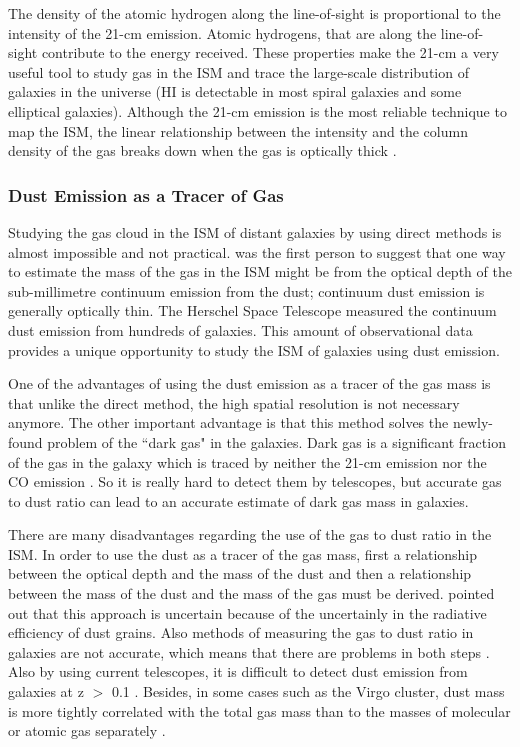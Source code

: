 The density of the atomic hydrogen along the line-of-sight is proportional to the intensity of the 21-cm emission. Atomic hydrogens, that are along the line-of-sight contribute to the energy received. These properties make the 21-cm a very useful tool to study gas in the ISM and trace the large-scale distribution of galaxies in the universe (HI is detectable in most spiral galaxies and some elliptical galaxies). Although the 21-cm emission is the most reliable technique to map the ISM, the linear relationship between the intensity and the column density of the gas breaks down when the gas is optically thick \citep{Braun09}.

\subsubsection{Dust Emission as a Tracer of Gas}

Studying the gas cloud in the ISM of distant galaxies by using direct methods is almost impossible and not practical. \cite{Hildebran83} was the first person to suggest that one way to estimate the mass of the gas in the ISM might be from the optical depth of the sub-millimetre continuum emission from the dust; continuum dust emission is generally optically thin. The Herschel Space Telescope \cite{Pilbratt10} measured the continuum dust emission from hundreds of galaxies\citep{Eales10, Oliver12}. This amount of observational data provides a unique opportunity to study the ISM of galaxies using dust emission. 

 One of the advantages of using the dust emission as a tracer of the gas mass is that unlike the direct method, the high spatial resolution is not necessary anymore. The other important advantage is that this method solves the newly-found problem of the ``dark gas" in the galaxies. Dark gas is a significant fraction of the gas in the galaxy which is traced by neither the 21-cm emission nor the CO emission \citep{Abdo10}. So it is really hard to detect them by telescopes, but accurate gas to dust ratio can lead to an accurate estimate of dark gas mass in galaxies. 

There are many disadvantages regarding the use of the gas to dust ratio in the ISM. In order to use the dust as a tracer of the gas mass, first a relationship between the optical depth and the mass of the dust and then a relationship between the mass of the dust and the mass of the gas must be derived. \cite{Draine03} pointed out that this approach is uncertain because of the uncertainly in the radiative efficiency of dust grains. Also methods of measuring the gas to dust ratio in galaxies are not accurate, which means that there are problems in both steps \citep{Hildebran83}. Also by using current telescopes, it is difficult to detect dust emission from galaxies at z $>$ 0.1 \citep{Ealas12}. Besides, in some cases such as the Virgo cluster, dust mass is more tightly correlated with the total gas mass than to the masses of molecular or atomic gas separately \citep{Corbelli11}. 

